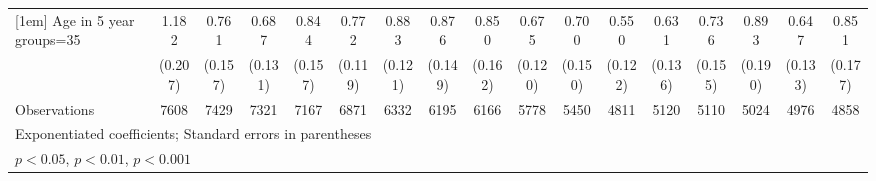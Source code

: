 {\begin{tabular}{l*{16}{c}}
[1em]
Age in 5 year groups=35&       1.182         &       0.761         &       0.687\sym{*}  &       0.844         &       0.772         &       0.883         &       0.876         &       0.850         &       0.675\sym{*}  &       0.700         &       0.550\sym{**} &       0.631\sym{*}  &       0.736         &       0.893         &       0.647\sym{*}  &       0.851         \\
                    &     (0.207)         &     (0.157)         &     (0.131)         &     (0.157)         &     (0.119)         &     (0.121)         &     (0.149)         &     (0.162)         &     (0.120)         &     (0.150)         &     (0.122)         &     (0.136)         &     (0.155)         &     (0.190)         &     (0.133)         &     (0.177)         \\
\hline
Observations        &        7608         &        7429         &        7321         &        7167         &        6871         &        6332         &        6195         &        6166         &        5778         &        5450         &        4811         &        5120         &        5110         &        5024         &        4976         &        4858         \\
\hline\hline
\multicolumn{17}{l}{\footnotesize Exponentiated coefficients; Standard errors in parentheses}\\
\multicolumn{17}{l}{\footnotesize \sym{*} \(p<0.05\), \sym{**} \(p<0.01\), \sym{***} \(p<0.001\)}\\
\end{tabular}
}
